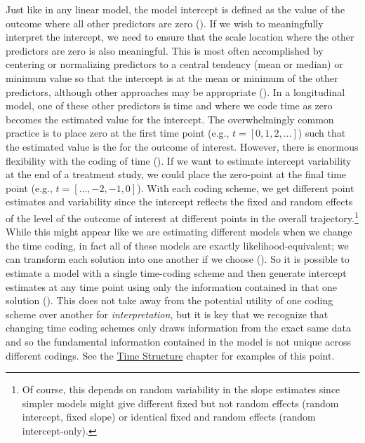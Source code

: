 \documentclass[11pt]{article}
\begin{document}
Just like in any linear model, the model intercept is defined as the value of the outcome where all other predictors are zero (\cite{bollen_latent_2006}). If we wish to meaningfully interpret the intercept, we need to ensure that the scale location where the other predictors are zero is also meaningful. This is most often accomplished by centering or normalizing predictors to a central tendency (mean or median) or minimum value so that the intercept is at the mean or minimum of the other predictors, although other approaches may be appropriate (\cite{aiken_multiple_1991,king_longitudinal_2018,mccormick_longitudinal_2021}). In a longitudinal model, one of these other predictors is time and where we code time as zero becomes the estimated value for the intercept. The overwhelmingly common practice is to place zero at the first time point (e.g., $t = [0, 1, 2, \ldots]$) such that the estimated value is the  for the outcome of interest. However, there is enormous flexibility with the coding of time (\cite{biesanz_role_2004,grimm_intercept_2012,mccormick_longitudinal_2021,mills_developmental_2014}). If we want to estimate intercept variability at the end of a treatment study, we could place the zero-point at the final time point (e.g., $t = [\ldots, -2, -1, 0]$). With each coding scheme, we get different point estimates and variability since the intercept reflects the fixed and random effects of the level of the outcome of interest at different points in the overall trajectory.\footnote{Of course, this depends on random variability in the slope estimates since simpler models might give different fixed but not random effects (random intercept, fixed slope) or identical fixed and random effects (random intercept-only).} While this might appear like we are estimating different models when we change the time coding, in fact all of these models are exactly likelihood-equivalent; we can transform each solution into one another if we choose (\cite{biesanz_role_2004}). So it is possible to estimate a model with a single time-coding scheme and then generate intercept estimates at any time point using only the information contained in that one solution (\cite{biesanz_role_2004,hancock_vernacular_2006}). This does not take away from the potential utility of one coding scheme over another for \textit{interpretation}, but it is key that we recognize that changing time coding schemes only draws information from the exact same data and so the fundamental information contained in the model is not unique across different codings. See the \href{https://e-m-mccormick.github.io/static/longitudinal-primer/03-time.html#time-coding}{Time Structure} chapter for examples of this point.
\end{document}
